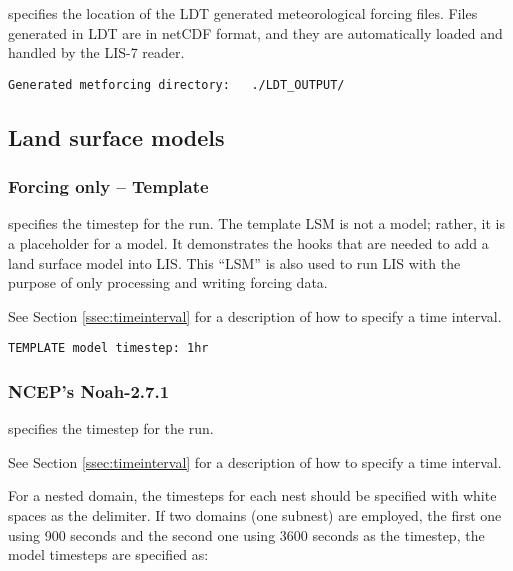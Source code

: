  
  specifies the location of the
 LDT generated meteorological forcing files.  Files generated in LDT
 are in netCDF format, and they are automatically loaded and handled 
 by the LIS-7 reader.
 
 \begin{Verbatim}[frame=single]
Generated metforcing directory:   ./LDT_OUTPUT/
 \end{Verbatim}

 
 \subsection{Land surface models} \label{ssec:lsm}
 

 
 \subsubsection{Forcing only -- Template} \label{sssec:lsm_template}
 

 
  specifies the timestep for the run.
 The template LSM is not a model;
 rather, it is a placeholder for a model.  It demonstrates the hooks
 that are needed to add a land surface model into LIS.  This ``LSM''
 is also used to run LIS with the purpose of only processing and writing
 forcing data.

 See Section \ref{ssec:timeinterval} for a description
 of how to specify a time interval.
 

 \begin{Verbatim}[frame=single]
TEMPLATE model timestep: 1hr
 \end{Verbatim}

 
 \subsubsection{NCEP's Noah-2.7.1} \label{sssec:lsm_noah271}
 

 
  specifies the timestep for the run.

 See Section \ref{ssec:timeinterval} for a description
 of how to specify a time interval.

 For a nested domain, the timesteps for each nest should be specified
 with white spaces as the delimiter. If two domains (one subnest) are
 employed, the first one using 900 seconds and the second one using
 3600 seconds as the timestep, the model timesteps are specified as:

